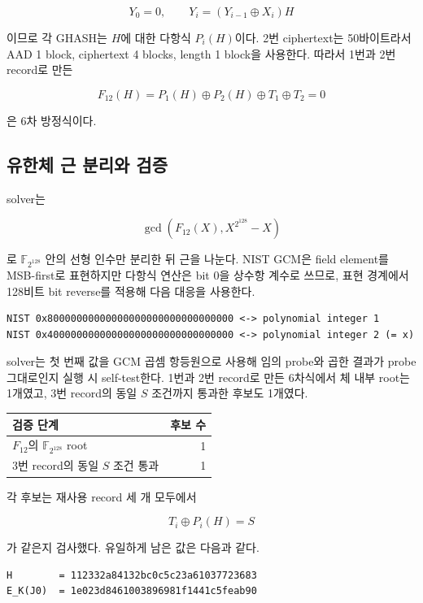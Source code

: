 \documentclass[10pt,a4paper]{article}
\begin{document}
\[
Y_0=0,\qquad Y_i=(Y_{i-1}\oplus X_i)H
\]

이므로 각 GHASH는 $H$에 대한 다항식 $P_i(H)$이다. 2번 ciphertext는
50바이트라서 AAD 1 block, ciphertext 4 blocks, length 1 block을
사용한다. 따라서 1번과 2번 record로 만든

\[
F_{12}(H)=P_1(H)\oplus P_2(H)\oplus T_1\oplus T_2=0
\]

은 6차 방정식이다.

\subsection{유한체 근 분리와 검증}

solver는

\[
\gcd\!\left(F_{12}(X),X^{2^{128}}-X\right)
\]

로 $\mathbb F_{2^{128}}$ 안의 선형 인수만 분리한 뒤 근을 나눈다.
NIST GCM은 field element를 MSB-first로 표현하지만 다항식 연산은 bit 0을
상수항 계수로 쓰므로, 표현 경계에서 128비트 bit reverse를 적용해 다음
대응을 사용한다.

\begin{lstlisting}
NIST 0x80000000000000000000000000000000 <-> polynomial integer 1
NIST 0x40000000000000000000000000000000 <-> polynomial integer 2 (= x)
\end{lstlisting}

solver는 첫 번째 값을 GCM 곱셈 항등원으로 사용해 임의 probe와 곱한
결과가 probe 그대로인지 실행 시 self-test한다. 1번과 2번 record로 만든
6차식에서 체 내부 root는 1개였고, 3번 record의 동일 $S$ 조건까지
통과한 후보도 1개였다.

\begin{center}
\begin{tabular}{lr}
\toprule
검증 단계 & 후보 수 \\
\midrule
$F_{12}$의 $\mathbb F_{2^{128}}$ root & 1 \\
3번 record의 동일 $S$ 조건 통과 & 1 \\
\bottomrule
\end{tabular}
\end{center}

각 후보는 재사용 record 세 개 모두에서

\[
T_i\oplus P_i(H)=S
\]

가 같은지 검사했다. 유일하게 남은 값은 다음과 같다.

\begin{lstlisting}
H        = 112332a84132bc0c5c23a61037723683
E_K(J0)  = 1e023d8461003896981f1441c5feab90
\end{lstlisting}
\end{document}
